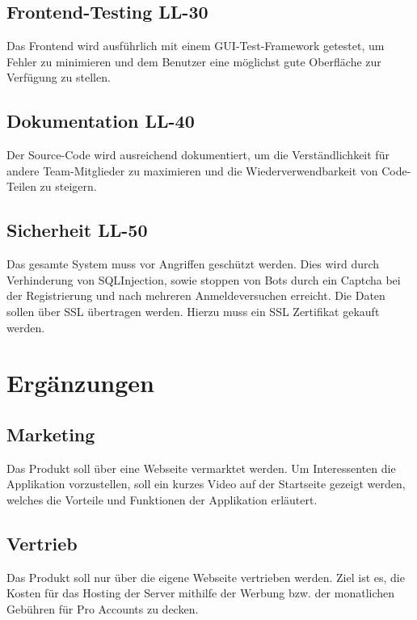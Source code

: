 \documentclass[12pt,a4paper,oneside,ngerman]{scrartcl}
\begin{document}
\subsection[Frontend-Testing]{Frontend-Testing \hfill LL-30}
Das Frontend wird ausführlich mit einem GUI-Test-Framework getestet, um Fehler zu minimieren und dem Benutzer eine möglichst gute Oberfläche zur Verfügung zu stellen.

\subsection[Dokumentation]{Dokumentation \hfill LL-40}
Der Source-Code wird ausreichend dokumentiert, um die Verständlichkeit für andere Team-Mitglieder zu maximieren und die Wiederverwendbarkeit von Code-Teilen zu steigern.

\subsection[Sicherheit]{Sicherheit \hfill LL-50}
Das gesamte System muss vor Angriffen geschützt werden. Dies wird durch Verhinderung von \gls{SQLInjection}, sowie stoppen von \gls{Bots} durch ein \gls{Captcha} bei der Registrierung und nach mehreren Anmeldeversuchen erreicht. Die Daten sollen über \gls{SSL} übertragen werden. Hierzu muss ein SSL Zertifikat gekauft werden.

\section{Ergänzungen}
\subsection{Marketing}
Das Produkt soll über eine Webseite vermarktet werden. Um Interessenten die Applikation vorzustellen, soll ein kurzes Video auf der Startseite gezeigt werden, welches die Vorteile und Funktionen der Applikation erläutert.

\subsection{Vertrieb}
Das Produkt soll nur über die eigene Webseite vertrieben werden. Ziel ist es, die Kosten für das Hosting der Server mithilfe der Werbung bzw. der monatlichen Gebühren für Pro Accounts zu decken.
\end{document}
